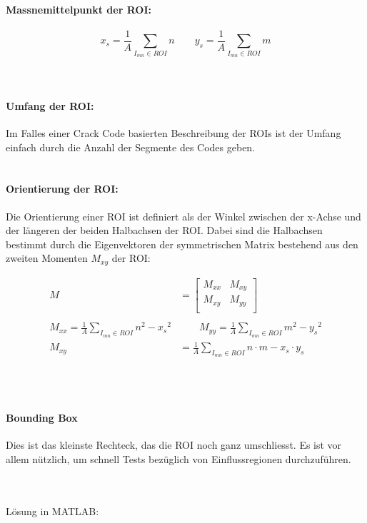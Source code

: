 \paragraph{Massnemittelpunkt der ROI:}
\[
	x_s = \frac{1}{A} \sum_{I_{mn}\in ROI}n \qquad y_s = \frac{1}{A} \sum_{I_{mn}\in ROI}m
\]
~\\\\
\paragraph{Umfang der ROI:\\}
Im Falles einer Crack Code basierten Beschreibung der ROIs ist der Umfang einfach durch die Anzahl der Segmente des Codes geben.\\
\\
\paragraph{Orientierung der ROI:\\}
Die Orientierung einer ROI ist definiert als der Winkel zwischen der x-Achse und der längeren der beiden Halbachsen der ROI.
Dabei sind die Halbachsen bestimmt durch die Eigenvektoren der symmetrischen Matrix bestehend aus den zweiten Momenten $M_{xy}$  der ROI:
\begin{scriptsize}\[\begin{aligned}
	M &= \left[\begin{matrix}
	 M_{xx} & M_{xy}\\
	 M_{xy} & M_{yy}\\
	\end{matrix}\right]\\\\
	M_{xx} = \frac{1}{A}\sum_{I_{mn}\in ROI}n^2-{x_s}^2& \qquad
	M_{yy} = \frac{1}{A}\sum_{I_{mn}\in ROI}m^2-{y_s}^2 \\
	M_{xy} &= \frac{1}{A}\sum_{I_{mn}\in ROI}n \cdot m-x_s \cdot y_s
\end{aligned}\]\end{scriptsize}
~\\\\
\paragraph{Bounding Box\\}
Dies ist das kleinste Rechteck, das die ROI noch ganz umschliesst. 
Es ist vor allem nützlich, um schnell Tests bezüglich von Einflussregionen durchzuführen.

~\\\\
Lösung in MATLAB:
\lstset{language=Matlab}

~\\
